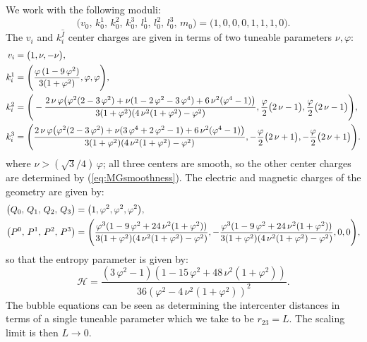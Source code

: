 \documentclass[12pt,a4paper]{article}
\begin{document}
We work with the following moduli:
\begin{equation}
\big(v_0,\,k^1_0,\,k^2_0,\,k^3_0,\,l^1_0,\,l^2_0,\,l^3_0,\,m_0\big)=\big(1,0,0,0,1,1,1,0\big).
\end{equation}
The $v_i$ and $k^{\hat{I}}_i$ center charges are given in terms of two tuneable parameters $\nu,\varphi$:
\begin{align}
v_i&=\big(1,\nu,-\nu\big),\notag\\
k^1_i&=\Bigg(\frac{\varphi\,(1-9\,\varphi^2)}{3(1+\varphi^2)},\varphi,\varphi\Bigg),\\
k^2_i&=\Bigg(-\frac{2\,\nu\,\varphi\big(\varphi^2(2-3\,\varphi^2)+\nu(1-2\,\varphi^2-3\,\varphi^4)+6\,\nu^2(\varphi^4-1)\big)}{3(1+\varphi^2)(4\,\nu^2(1+\varphi^2)-\varphi^2)},\frac{\varphi}{2}\big(2\,\nu-1\big),\frac{\varphi}{2}\big(2\,\nu-1\big)\Bigg),\notag\\
k^3_i&=\Bigg(\frac{2\,\nu\,\varphi\big(\varphi^2(2-3\,\varphi^2)+\nu(3\,\varphi^4+2\,\varphi^2-1)+6\,\nu^2(\varphi^4-1)\big)}{3(1+\varphi^2)(4\,\nu^2(1+\varphi^2)-\varphi^2)},-\frac{\varphi}{2}\big(2\,\nu+1\big),-\frac{\varphi}{2}\big(2\,\nu+1\big)\Bigg).\notag
\end{align}
where $\nu>(\sqrt{3}/4)\,\varphi$; all three centers are smooth, so the other center charges are determined by (\ref{eq:MGsmoothness}). The electric and magnetic charges of the geometry are given by:
\begin{align}\label{eq:MGcharges}
\big(Q_0,\,Q_1,\,Q_2,\,Q_3\big)&=\big(1,\varphi^2,\varphi^2,\varphi^2\big),\\
\big(P^0,\,P^1,\,P^2,\,P^3\big)&=\Bigg(\frac{\varphi^3(1-9\,\varphi^2+24\,\nu^2(1+\varphi^2))}{3(1+\varphi^2)(4\,\nu^2(1+\varphi^2)-\varphi^2)},-\frac{\varphi^3(1-9\,\varphi^2+24\,\nu^2(1+\varphi^2))}{3(1+\varphi^2)(4\,\nu^2(1+\varphi^2)-\varphi^2)},0,0\Bigg),\notag
\end{align}
so that the entropy parameter is given by:
\begin{equation}
\mathcal{H}=\frac{(3\,\varphi^2-1)(1-15\,\varphi^2+48\,\nu^2(1+\varphi^2))}{36(\varphi^2-4\,\nu^2(1+\varphi^2))^2}.
\end{equation}
The bubble equations can be seen as determining the intercenter distances in terms of a single tuneable parameter which we take to be $r_{23}=L$. The scaling limit is then $L\rightarrow0$.
\end{document}

